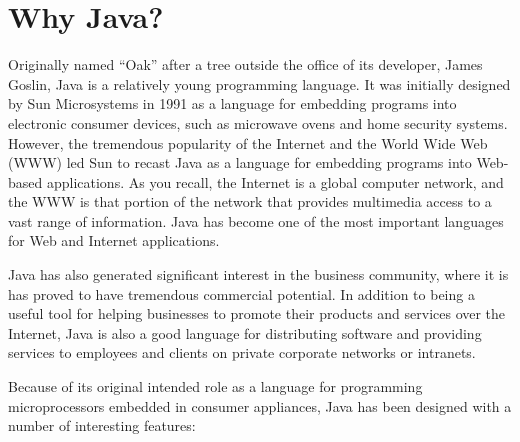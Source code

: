 \vspace*{-10pt}
\section{Why Java?}
\noindent Originally named ``Oak'' after a tree outside the office of its
developer, James Goslin, Java is a relatively young programming
language.  It was initially designed by Sun Microsystems in 1991 as a
language for embedding programs into electronic consumer devices, such
as microwave ovens and home security systems.  However, the tremendous
popularity of the Internet and the World Wide Web (WWW)
led Sun to recast Java as a language for embedding programs into
Web-based applications.  As you recall, the Internet is a
global computer network, and the WWW is that portion of the network
that provides multimedia access to a vast range of information.  Java
has become one of the most important languages for Web and Internet
applications.

Java has also generated significant interest in the business
community, where it is has proved to have tremendous commercial
potential.  In addition to being a useful tool for helping businesses
to promote their products and services over the Internet, Java is also a
good language for distributing software and providing services to
employees and clients on private corporate networks or intranets.

Because of its original intended role as a language for programming
microprocessors embedded in consumer appliances, Java has been
designed with a number of interesting features:


